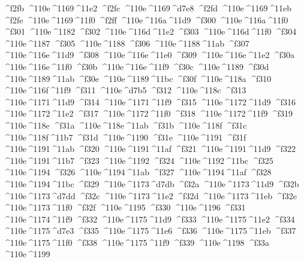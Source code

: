 \checkit ^^^^f2fb ^^^^110e^^^^1169^^^^11e2
\checkit ^^^^f2fc ^^^^110e^^^^1169^^^^d7e8
\checkit ^^^^f2fd ^^^^110e^^^^1169^^^^11eb
\checkit ^^^^f2fe ^^^^110e^^^^1169^^^^11f0
\checkit ^^^^f2ff ^^^^110e^^^^116a^^^^11d9
\checkit ^^^^f300 ^^^^110e^^^^116a^^^^11f0
\checkit ^^^^f301 ^^^^110e^^^^1182
\checkit ^^^^f302 ^^^^110e^^^^116d^^^^11e2
\checkit ^^^^f303 ^^^^110e^^^^116d^^^^11f0
\checkit ^^^^f304 ^^^^110e^^^^1187
\checkit ^^^^f305 ^^^^110e^^^^1188
\checkit ^^^^f306 ^^^^110e^^^^1188^^^^11ab
\checkit ^^^^f307 ^^^^110e^^^^116e^^^^11d9
\checkit ^^^^f308 ^^^^110e^^^^116e^^^^11e0
\checkit ^^^^f309 ^^^^110e^^^^116e^^^^11e2
\checkit ^^^^f30a ^^^^110e^^^^116e^^^^11f0
\checkit ^^^^f30b ^^^^110e^^^^116e^^^^11f9
\checkit ^^^^f30c ^^^^110e^^^^1189
\checkit ^^^^f30d ^^^^110e^^^^1189^^^^11ab
\checkit ^^^^f30e ^^^^110e^^^^1189^^^^11bc
\checkit ^^^^f30f ^^^^110e^^^^118a
\checkit ^^^^f310 ^^^^110e^^^^116f^^^^11f9
\checkit ^^^^f311 ^^^^110e^^^^d7b5
\checkit ^^^^f312 ^^^^110e^^^^118c
\checkit ^^^^f313 ^^^^110e^^^^1171^^^^11d9
\checkit ^^^^f314 ^^^^110e^^^^1171^^^^11f9
\checkit ^^^^f315 ^^^^110e^^^^1172^^^^11d9
\checkit ^^^^f316 ^^^^110e^^^^1172^^^^11e2
\checkit ^^^^f317 ^^^^110e^^^^1172^^^^11f0
\checkit ^^^^f318 ^^^^110e^^^^1172^^^^11f9
\checkit ^^^^f319 ^^^^110e^^^^118e
\checkit ^^^^f31a ^^^^110e^^^^118e^^^^11ab
\checkit ^^^^f31b ^^^^110e^^^^118f
\checkit ^^^^f31c ^^^^110e^^^^118f^^^^11b7
\checkit ^^^^f31d ^^^^110e^^^^1190
\checkit ^^^^f31e ^^^^110e^^^^1191
\checkit ^^^^f31f ^^^^110e^^^^1191^^^^11ab
\checkit ^^^^f320 ^^^^110e^^^^1191^^^^11af
\checkit ^^^^f321 ^^^^110e^^^^1191^^^^11d9
\checkit ^^^^f322 ^^^^110e^^^^1191^^^^11b7
\checkit ^^^^f323 ^^^^110e^^^^1192
\checkit ^^^^f324 ^^^^110e^^^^1192^^^^11bc
\checkit ^^^^f325 ^^^^110e^^^^1194
\checkit ^^^^f326 ^^^^110e^^^^1194^^^^11ab
\checkit ^^^^f327 ^^^^110e^^^^1194^^^^11af
\checkit ^^^^f328 ^^^^110e^^^^1194^^^^11bc
\checkit ^^^^f329 ^^^^110e^^^^1173^^^^d7db
\checkit ^^^^f32a ^^^^110e^^^^1173^^^^11d9
\checkit ^^^^f32b ^^^^110e^^^^1173^^^^d7dd
\checkit ^^^^f32c ^^^^110e^^^^1173^^^^11e2
\checkit ^^^^f32d ^^^^110e^^^^1173^^^^11eb
\checkit ^^^^f32e ^^^^110e^^^^1173^^^^11f0
\checkit ^^^^f32f ^^^^110e^^^^1195
\checkit ^^^^f330 ^^^^110e^^^^1196
\checkit ^^^^f331 ^^^^110e^^^^1174^^^^11f9
\checkit ^^^^f332 ^^^^110e^^^^1175^^^^11d9
\checkit ^^^^f333 ^^^^110e^^^^1175^^^^11e2
\checkit ^^^^f334 ^^^^110e^^^^1175^^^^d7e3
\checkit ^^^^f335 ^^^^110e^^^^1175^^^^11e6
\checkit ^^^^f336 ^^^^110e^^^^1175^^^^11eb
\checkit ^^^^f337 ^^^^110e^^^^1175^^^^11f0
\checkit ^^^^f338 ^^^^110e^^^^1175^^^^11f9
\checkit ^^^^f339 ^^^^110e^^^^1198
\checkit ^^^^f33a ^^^^110e^^^^1199
